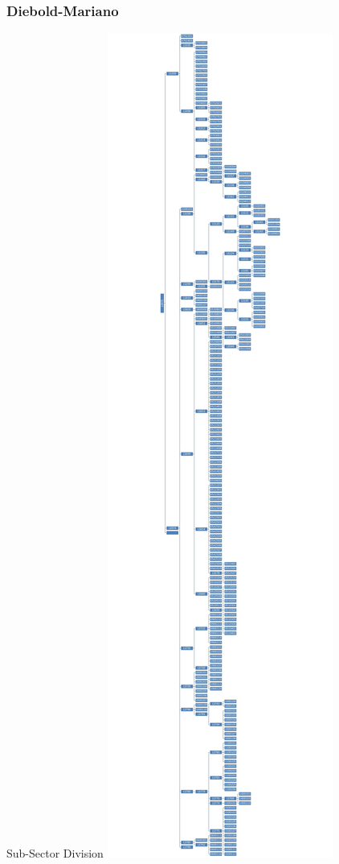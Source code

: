 \documentclass[]{beamer}
\begin{document}
\subsubsection{Diebold-Mariano}
\begin{frame}{Sub-Sector Division}
    \centering
        \includegraphics[scale=0.03]{Images/tree.jpg}
\end{frame}
\end{document}
